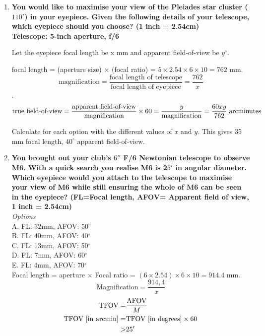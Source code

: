 \documentclass[a4paper,12pt]{extarticle}
\begin{document}
\begin{enumerate}
	
	\item \textbf{You would like to maximise your view of the Pleiades star cluster ($110'$) in your eyepiece. Given the following details of your telescope, which eyepiece should you choose? (1 inch = 2.54cm)}\\
	
	\textbf{Telescope: 5-inch aperture, f/6}\\

{\color{blue}  Let the eyepiece focal length be x mm and apparent field-of-view be $y^\circ$.
	
focal length = (aperture size) $\times$ (focal ratio) = $5 \times 2.54 \times 6 \times 10 = 762$ mm.\\

$$\text{magnification}=\frac{\text{focal length of telescope}}{\text{focal length of eyepiece}}=\frac{762}{x}$$.
$$\text{true field-of-view}=\frac{\text{apparent field-of-view}}{\text{magnification}}\times 60= \frac{y}{\text{magnification}}=\frac{60xy}{762}\; \rm arcminutes$$

Calculate for each option with the different values of $x$ and $y$. This gives 35 mm focal length, $40^\circ$ apparent field-of-view.}
	
\item \textbf{You brought out your club’s $6''$ F/6 Newtonian telescope to observe M6. With a quick search you realise M6 is 2$5'$ in angular diameter. Which eyepiece would you attach to the telescope to maximise your view of M6 while still ensuring the whole of M6 can be seen in the eyepiece? (FL=Focal length,
AFOV= Apparent field of view, 1 inch = 2.54cm)}	\\

\textit{Options}\\
A. FL: 32mm, AFOV: 50$^\circ$\\
B. FL: 40mm, AFOV: 40$^\circ$\\
C. FL: 13mm, AFOV: 50$^\circ$\\
D. FL: 7mm, AFOV: 60$^\circ$\\
E. FL: 4mm, AFOV: 70$^\circ$\\

Focal length = aperture $\times$ Focal ratio = $(6\times 2.54) \times 6 \times 10  = 914.4$ mm.\\
$$\text{Magnification} =\frac{914,4}{x}$$
\begin{align*}
	\text{TFOV}=&\frac{\rm AFOV}{M}\\
	\text{TFOV [in arcmin]}=&\text{TFOV [in degrees]} \times 60\\
	>& 25'
\end{align*}


\end{enumerate}
\end{document}
